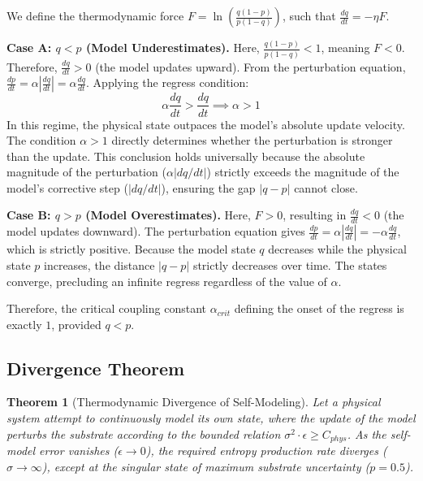 \documentclass[12pt]{article}
\newtheorem{theorem}{Theorem}
\begin{document}
We define the thermodynamic force $F = \ln\left( \frac{q(1-p)}{p(1-q)} \right)$, such that $\frac{dq}{dt} = -\eta F$.

\textbf{Case A: $q < p$ (Model Underestimates).}
Here, $\frac{q(1-p)}{p(1-q)} < 1$, meaning $F < 0$. Therefore, $\frac{dq}{dt} > 0$ (the model updates upward).
From the perturbation equation, $\frac{dp}{dt} = \alpha \left|\frac{dq}{dt}\right| = \alpha \frac{dq}{dt}$.
Applying the regress condition:
\begin{equation}
    \alpha \frac{dq}{dt} > \frac{dq}{dt} \implies \alpha > 1
\end{equation}
In this regime, the physical state outpaces the model's absolute update velocity. The condition $\alpha > 1$ directly determines whether the perturbation is stronger than the update. This conclusion holds universally because the absolute magnitude of the perturbation ($\alpha |dq/dt|$) strictly exceeds the magnitude of the model's corrective step ($|dq/dt|$), ensuring the gap $|q-p|$ cannot close.

\textbf{Case B: $q > p$ (Model Overestimates).}
Here, $F > 0$, resulting in $\frac{dq}{dt} < 0$ (the model updates downward).
The perturbation equation gives $\frac{dp}{dt} = \alpha \left|\frac{dq}{dt}\right| = -\alpha \frac{dq}{dt}$, which is strictly positive.
Because the model state $q$ decreases while the physical state $p$ increases, the distance $|q-p|$ strictly decreases over time. The states converge, precluding an infinite regress regardless of the value of $\alpha$.

Therefore, the critical coupling constant $\alpha_{crit}$ defining the onset of the regress is exactly $1$, provided $q < p$.

\subsection{Divergence Theorem}

\begin{theorem}[Thermodynamic Divergence of Self-Modeling]
Let a physical system attempt to continuously model its own state, where the update of the model perturbs the substrate according to the bounded relation $\sigma^2 \cdot \epsilon \ge C_{phys}$. As the self-model error vanishes ($\epsilon \to 0$), the required entropy production rate diverges ($\sigma \to \infty$), except at the singular state of maximum substrate uncertainty ($p=0.5$).
\end{theorem}
\end{document}
